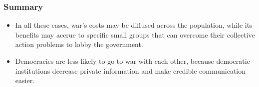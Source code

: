 \documentclass[handout]{beamer}
\begin{document}
\begin{frame} 
	\frametitle{\LARGE{Summary}}
	\begin{itemize} 
		\item In all these cases, war's costs may be diffused across the population, while its benefits may accrue to specific small groups that can overcome their collective action problems to lobby the government.
		\item Democracies are less likely to go to war with each other, because democratic institutions decrease private information and make credible communication easier.
	\end{itemize}
\end{frame}
\end{document}
